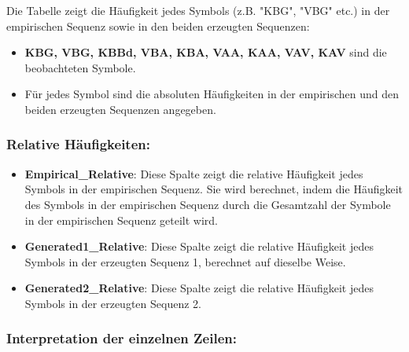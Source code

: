\documentclass[
]{article}
\begin{document}
Die Tabelle zeigt die Häufigkeit jedes Symbols (z.B. "KBG", "VBG" etc.)
in der empirischen Sequenz sowie in den beiden erzeugten Sequenzen:

\begin{itemize}
\item
  \textbf{KBG, VBG, KBBd, VBA, KBA, VAA, KAA, VAV, KAV} sind die
  beobachteten Symbole.
\item
  Für jedes Symbol sind die absoluten Häufigkeiten in der empirischen
  und den beiden erzeugten Sequenzen angegeben.
\end{itemize}

\subsubsection{\texorpdfstring{\textbf{Relative
Häufigkeiten:}}{Relative Häufigkeiten:}}\label{relative-huxe4ufigkeiten}

\begin{itemize}
\item
  \textbf{Empirical\_Relative}: Diese Spalte zeigt die relative
  Häufigkeit jedes Symbols in der empirischen Sequenz. Sie wird
  berechnet, indem die Häufigkeit des Symbols in der empirischen Sequenz
  durch die Gesamtzahl der Symbole in der empirischen Sequenz geteilt
  wird.
\item
  \textbf{Generated1\_Relative}: Diese Spalte zeigt die relative
  Häufigkeit jedes Symbols in der erzeugten Sequenz 1, berechnet auf
  dieselbe Weise.
\item
  \textbf{Generated2\_Relative}: Diese Spalte zeigt die relative
  Häufigkeit jedes Symbols in der erzeugten Sequenz 2.
\end{itemize}

\subsubsection{\texorpdfstring{\textbf{Interpretation der einzelnen
Zeilen:}}{Interpretation der einzelnen Zeilen:}}\label{interpretation-der-einzelnen-zeilen}
\end{document}
